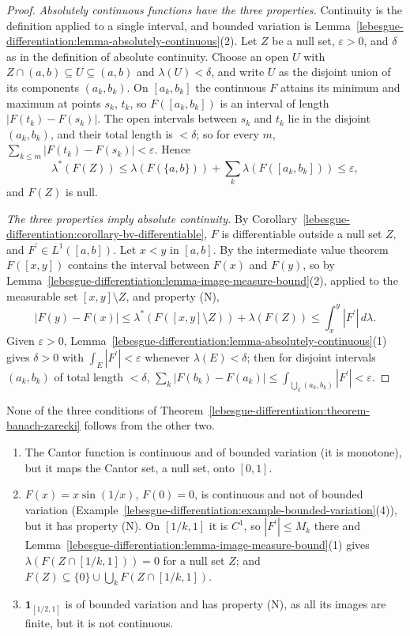 \begin{proof}
\emph{Absolutely continuous functions have the three properties.} Continuity is the definition applied to a single interval, and bounded variation is
Lemma~\ref{lebesgue-differentiation:lemma-absolutely-continuous}(2). Let $Z$ be a null set, $\varepsilon > 0$, and $\delta$ as in the definition of absolute continuity. Choose an open $U$ with
$Z \cap (a, b) \subseteq U \subseteq (a, b)$ and $\lambda(U) < \delta$, and write $U$ as the disjoint union of its components $(a_k, b_k)$. On $[a_k, b_k]$ the continuous $F$ attains its minimum and maximum at points
$s_k$, $t_k$, so $F([a_k, b_k])$ is an interval of length $|F(t_k) - F(s_k)|$. The open intervals between $s_k$ and $t_k$ lie in the disjoint $(a_k, b_k)$, and their total length is $< \delta$; so for every $m$,
$\sum_{k \leq m}|F(t_k) - F(s_k)| < \varepsilon$. Hence
\[
\lambda^*(F(Z)) \leq \lambda(F(\{a, b\})) + \sum_k\lambda(F([a_k, b_k])) \leq \varepsilon,
\]
and $F(Z)$ is null.

\emph{The three properties imply absolute continuity.} By Corollary~\ref{lebesgue-differentiation:corollary-bv-differentiable}, $F$ is differentiable outside a null set $Z$, and $F^{\prime} \in L^1([a, b])$. Let
$x < y$ in $[a, b]$. By the intermediate value theorem $F([x, y])$ contains the interval between $F(x)$ and $F(y)$, so by Lemma~\ref{lebesgue-differentiation:lemma-image-measure-bound}(2), applied to the measurable
set $[x, y] \setminus Z$, and property (N),
\[
|F(y) - F(x)| \leq \lambda^*(F([x, y] \setminus Z)) + \lambda(F(Z)) \leq \int_x^y|F^{\prime}|\,d\lambda .
\]
Given $\varepsilon > 0$, Lemma~\ref{lebesgue-differentiation:lemma-absolutely-continuous}(1) gives $\delta > 0$ with $\int_E|F^{\prime}| < \varepsilon$ whenever $\lambda(E) < \delta$; then for disjoint intervals $(a_k, b_k)$
of total length $< \delta$, $\sum_k|F(b_k) - F(a_k)| \leq \int_{\bigcup_k(a_k, b_k)}|F^{\prime}| < \varepsilon$.
\end{proof}

\begin{counterexample}\label{lebesgue-differentiation:counterexample-banach-zarecki}
None of the three conditions of Theorem~\ref{lebesgue-differentiation:theorem-banach-zarecki} follows from the other two.
\begin{enumerate}
\item The Cantor function is continuous and of bounded variation (it is monotone), but it maps the Cantor set, a null set, onto $[0, 1]$.
\item $F(x) = x\sin(1/x)$, $F(0) = 0$, is continuous and not of bounded variation (Example~\ref{lebesgue-differentiation:example-bounded-variation}(4)), but it has property (N). On $[1/k, 1]$ it is $C^1$, so
$|F^{\prime}| \leq M_k$ there and Lemma~\ref{lebesgue-differentiation:lemma-image-measure-bound}(1) gives $\lambda(F(Z \cap [1/k, 1])) = 0$ for a null set $Z$; and
$F(Z) \subseteq \{0\} \cup \bigcup_kF(Z \cap [1/k, 1])$.
\item $\mathbf{1}_{[1/2, 1]}$ is of bounded variation and has property (N), as all its images are finite, but it is not continuous.
\end{enumerate}
\end{counterexample}

